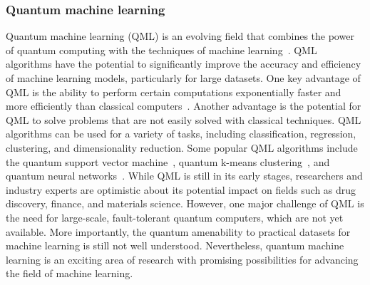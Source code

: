 \documentclass{article}
\begin{document}
\subsubsection{Quantum machine learning}\label{section:qml}
Quantum machine learning (QML) is an evolving field that combines the power of quantum computing with the techniques of machine learning~\cite{biamonte2017quantum, schuld2015introduction, cerezo2022challenges}. QML algorithms have the potential to significantly improve the accuracy and efficiency of machine learning models, particularly for large datasets. One key advantage of QML is the ability to perform certain computations exponentially faster and more efficiently than classical computers~\cite{havlivcek2019supervised, liu2021rigorous}. Another advantage is the potential for QML to solve problems that are not easily solved with classical techniques. QML algorithms can be used for a variety of tasks, including classification, regression, clustering, and dimensionality reduction. Some popular QML algorithms include the quantum support vector machine~\cite{Rebentrost_2014}, quantum k-means clustering~\cite{Kavitha2022}, and quantum neural networks~\cite{abbas2021power}. While QML is still in its early stages, researchers and industry experts are optimistic about its potential impact on fields such as drug discovery, finance, and materials science. However, one major challenge of QML is the need for large-scale, fault-tolerant quantum computers, which are not yet available. More importantly, the quantum amenability to practical datasets for machine learning is still not well understood. Nevertheless, quantum machine learning is an exciting area of research with promising possibilities for advancing the field of machine learning.
\end{document}
